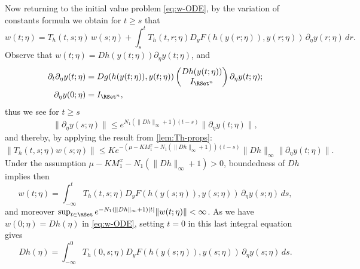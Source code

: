 \documentclass[a4paper]{siamart190516}
\begin{document}
Now returning to the initial value problem \cref{eq:w-ODE}, by the variation of constants formula we obtain for $t \geq s$ that
\[
w(t;\eta) = T_h(t,s;\eta) \, w(s;\eta) + \int_s^t T_h(t,r;\eta) D_y F(h(y(r;\eta)),y(r;\eta)) \, \partial_{\eta} y(r;\eta) \, dr.
\]
Observe that $w(t;\eta) = D h(y(t;\eta)) \partial_{\eta} y(t;\eta)$, and
 \begin{align*}
 \partial_t \partial_{\eta} y(t;\eta) &=  D g(h(y(t;\eta)), y(t;\eta)) \begin{pmatrix} Dh(y(t;\eta)) \\ I_{\RSet^n} \end{pmatrix} \partial_{\eta} y(t;\eta); \\
 \partial_{\eta} y(0;\eta) &=  I_{\RSet^n},
 \end{align*}
 thus we see for $t \geq s$
 \[
\| \partial_{\eta} y(s;\eta) \| \leq e^{N_1(\| Dh \|_{\infty} +1) (t-s)} \| \partial_{\eta}y(t;\eta) \|,
 \]
 and thereby, by applying the result from \cref{lem:Th-props}:
 \[
 \| T_h(t,s;\eta) w(s;\eta) \| \leq K e^{-(\mu-KM^x_1-N_1(\| Dh \|_{\infty} +1))(t-s)} \| Dh \|_{\infty} \| \partial_{\eta}y(t;\eta) \|.
 \]
 Under the assumption $\mu-KM^x_1-N_1(\| D h \|_{\infty} +1)> 0$, boundedness of $D h$ implies then
\begin{equation}\label{eq:LP-formula-w}
w(t;\eta) = \int_{-\infty}^t T_h(t,s;\eta) D_y F(h(y(s;\eta)),y(s;\eta)) \, \partial_{\eta} y(s; \eta) \, ds,
\end{equation}
and moreover $\sup_{t \in \RSet} e^{-N_1(\|Dh\|_{\infty}+1)|t|} \| w(t ;\eta) \| < \infty$. As we have $w(0;\eta) = Dh(\eta)$ in  \cref{eq:w-ODE}, setting $t=0$ in this last integral equation gives
\[
Dh(\eta) = \int_{-\infty}^0 T_h(0,s;\eta) D_y F(h(y(s;\eta)),y(s;\eta)) \, \partial_{\eta} y(s;\eta) \, ds.
\]
\end{document}
